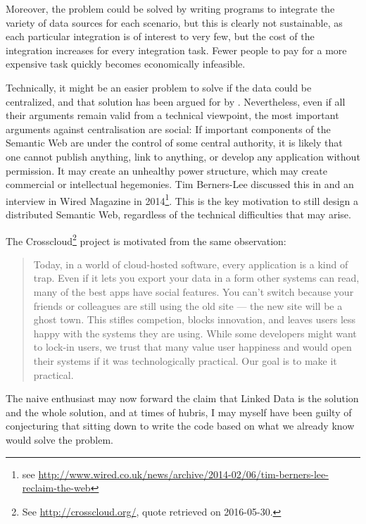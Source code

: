 Moreover, the problem could be solved by writing programs to integrate
the variety of data sources for each scenario, but this is clearly not
sustainable, as each particular integration is of interest to very
few, but the cost of the integration increases for every integration
task. Fewer people to pay for a more expensive task quickly becomes
economically infeasible.

Technically, it might be an easier problem to solve if the data could
be centralized, and that solution has been argued for by
\cite{DBLP:conf/semweb/BetzGHS12}. Nevertheless, even if all their
arguments remain valid from a technical viewpoint, the most important
arguments against centralisation are social: If important components
of the Semantic Web are under the control of some central authority, it
is likely that one cannot publish anything, link to anything, or
develop any application without permission. It may create an unhealthy
power structure, which may create commercial or intellectual
hegemonies. Tim Berners-Lee discussed this in \cite{berners2000weaving} and an
interview in Wired Magazine in 2014\footnote{see
  \url{http://www.wired.co.uk/news/archive/2014-02/06/tim-berners-lee-reclaim-the-web}}.
This is the key motivation to still design a distributed Semantic Web,
regardless of the technical difficulties that may arise.

The Crosscloud\footnote{See \url{http://crosscloud.org/}, quote
  retrieved on 2016-05-30.} project is motivated from the same
observation:
\begin{quote}
Today, in a world of cloud-hosted software, every application is a
kind of trap. Even if it lets you export your data in a form other
systems can read, many of the best apps have social features. You
can't switch because your friends or colleagues are still using the
old site — the new site will be a ghost town. This stifles competion,
blocks innovation, and leaves users less happy with the systems they
are using. While some developers might want to lock-in users, we trust
that many value user happiness and would open their systems if it was
technologically practical. Our goal is to make it practical.
\end{quote}

The naive enthusiast may now forward the claim that Linked Data is the
solution and the whole solution, and at times of hubris, I may myself
have been guilty of conjecturing that sitting down to write the code
based on what we already know would solve the problem.

